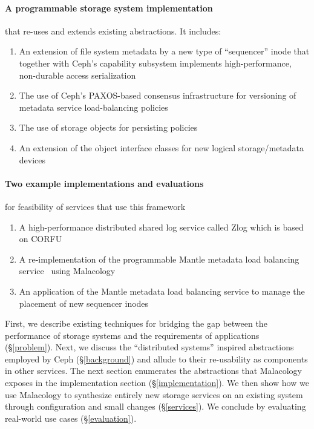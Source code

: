 \documentclass[10pt,twocolumn]{article}
\begin{document}
\paragraph*{A programmable storage system implementation} that re-uses and extends existing abstractions. It includes:

  \begin{enumerate}
  \item
    An extension of file system metadata by a new type of ``sequencer'' inode that together with Ceph's capability subsystem implements high-performance, non-durable access serialization
  \item
    The use of Ceph's PAXOS-based consensus infrastructure for versioning of metadata service load-balancing policies
  \item
    The use of storage objects for persisting policies
  \item
    An extension of the object interface classes for new logical storage/metadata devices
  \end{enumerate}

\paragraph*{Two example implementations and evaluations} for feasibility of services that use this framework

  \begin{enumerate}
  \item
    A high-performance distributed shared log service called Zlog which is based on CORFU~\cite{balakrishnan_corfu_2012}
  \item
    A re-implementation of the programmable Mantle metadata load balancing service~\cite{sevilla:sc15-mantle} using Malacology
  \item 
    An application of the Mantle metadata load balancing service to manage the placement of new sequencer inodes
  \end{enumerate}

First, we describe existing techniques for bridging the gap between the
performance of storage systems and the requirements of applications
(\S\ref{problem}). Next, we discuss the ``distributed systems'' inspired
abstractions employed by Ceph (\S\ref{background}) and allude to their
re-usability as components in other services. The next section
enumerates the abstractions that Malacology exposes in the
implementation section (\S\ref{implementation}). We then show how we use
Malacology to synthesize entirely new storage services on an existing
system through configuration and small changes (\S\ref{services}). We
conclude by evaluating real-world use cases (\S\ref{evaluation}).
\end{document}
